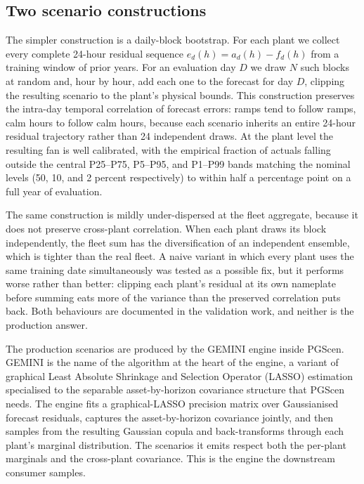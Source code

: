 \documentclass[11pt]{article}
\begin{document}
\subsection{Two scenario constructions}

The simpler construction is a daily-block bootstrap. For each plant we
collect every complete 24-hour residual sequence $e_d(h) = a_d(h) -
f_d(h)$ from a training window of prior years. For an evaluation day
$D$ we draw $N$ such blocks at random and, hour by hour, add each one
to the forecast for day $D$, clipping the resulting scenario to the
plant's physical bounds. This construction preserves the intra-day
temporal correlation of forecast errors: ramps tend to follow ramps,
calm hours to follow calm hours, because each scenario inherits an
entire 24-hour residual trajectory rather than 24 independent draws.
At the plant level the resulting fan is well calibrated, with the
empirical fraction of actuals falling outside the central P25--P75,
P5--P95, and P1--P99 bands matching the nominal levels (50, 10, and 2
percent respectively) to within half a percentage point on a full year
of evaluation.

The same construction is mildly under-dispersed at the fleet
aggregate, because it does not preserve cross-plant correlation. When
each plant draws its block independently, the fleet sum has the
diversification of an independent ensemble, which is tighter than the
real fleet. A naive variant in which every plant uses the same
training date simultaneously was tested as a possible fix, but it
performs worse rather than better: clipping each plant's residual at
its own nameplate before summing eats more of the variance than the
preserved correlation puts back. Both behaviours are documented in the
validation work, and neither is the production answer.

The production scenarios are produced by the GEMINI engine inside
PGScen. GEMINI is the name of the algorithm at the heart of the
engine, a variant of graphical Least Absolute Shrinkage and Selection
Operator (LASSO) estimation specialised to the separable
asset-by-horizon covariance structure that PGScen needs. The engine
fits a graphical-LASSO precision matrix over Gaussianised forecast
residuals, captures the asset-by-horizon covariance jointly, and then
samples from the resulting Gaussian copula and back-transforms through
each plant's marginal distribution. The scenarios it emits respect
both the per-plant marginals and the cross-plant covariance. This is
the engine the downstream consumer samples.
\end{document}
